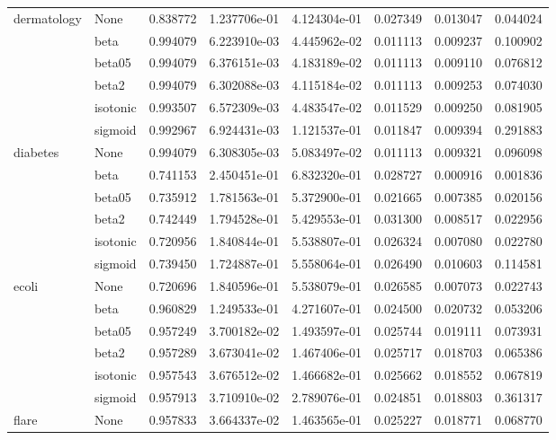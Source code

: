 \begin{tabular}{llrrrrrr}
dermatology & None &  0.838772 &  1.237706e-01 &  4.124304e-01 &  0.027349 &  0.013047 &  0.044024 \\
        & beta &  0.994079 &  6.223910e-03 &  4.445962e-02 &  0.011113 &  0.009237 &  0.100902 \\
        & beta05 &  0.994079 &  6.376151e-03 &  4.183189e-02 &  0.011113 &  0.009110 &  0.076812 \\
        & beta2 &  0.994079 &  6.302088e-03 &  4.115184e-02 &  0.011113 &  0.009253 &  0.074030 \\
        & isotonic &  0.993507 &  6.572309e-03 &  4.483547e-02 &  0.011529 &  0.009250 &  0.081905 \\
        & sigmoid &  0.992967 &  6.924431e-03 &  1.121537e-01 &  0.011847 &  0.009394 &  0.291883 \\
diabetes & None &  0.994079 &  6.308305e-03 &  5.083497e-02 &  0.011113 &  0.009321 &  0.096098 \\
        & beta &  0.741153 &  2.450451e-01 &  6.832320e-01 &  0.028727 &  0.000916 &  0.001836 \\
        & beta05 &  0.735912 &  1.781563e-01 &  5.372900e-01 &  0.021665 &  0.007385 &  0.020156 \\
        & beta2 &  0.742449 &  1.794528e-01 &  5.429553e-01 &  0.031300 &  0.008517 &  0.022956 \\
        & isotonic &  0.720956 &  1.840844e-01 &  5.538807e-01 &  0.026324 &  0.007080 &  0.022780 \\
        & sigmoid &  0.739450 &  1.724887e-01 &  5.558064e-01 &  0.026490 &  0.010603 &  0.114581 \\
ecoli & None &  0.720696 &  1.840596e-01 &  5.538079e-01 &  0.026585 &  0.007073 &  0.022743 \\
        & beta &  0.960829 &  1.249533e-01 &  4.271607e-01 &  0.024500 &  0.020732 &  0.053206 \\
        & beta05 &  0.957249 &  3.700182e-02 &  1.493597e-01 &  0.025744 &  0.019111 &  0.073931 \\
        & beta2 &  0.957289 &  3.673041e-02 &  1.467406e-01 &  0.025717 &  0.018703 &  0.065386 \\
        & isotonic &  0.957543 &  3.676512e-02 &  1.466682e-01 &  0.025662 &  0.018552 &  0.067819 \\
        & sigmoid &  0.957913 &  3.710910e-02 &  2.789076e-01 &  0.024851 &  0.018803 &  0.361317 \\
flare & None &  0.957833 &  3.664337e-02 &  1.463565e-01 &  0.025227 &  0.018771 &  0.068770 \\

\end{tabular}
